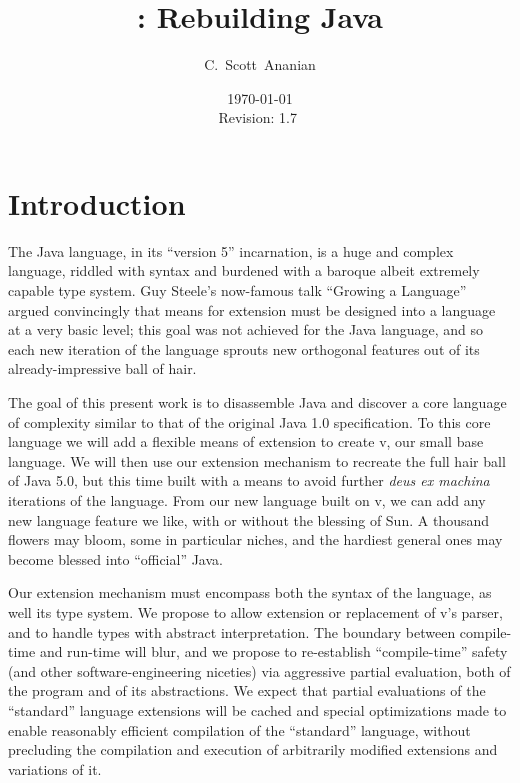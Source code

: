 \documentclass[11pt,notitlepage,twocolumn]{article}
\author{C.~Scott~Ananian}
\title{\vlang: Rebuilding Java}
\date{\today \\ $ $Revision: 1.7 $ $}
\newcommand{\vlang}{\textsf{v}\xspace}
\begin{document}

\maketitle

\section{Introduction}
The Java language, in its ``version 5'' incarnation, is a huge and
complex language, riddled with syntax and burdened with a baroque
albeit extremely capable type system.  Guy Steele's now-famous talk
``Growing a Language'' \cite{Steele99} argued convincingly that means
for extension must be designed into a language at a very basic level;
this goal was not achieved for the Java language, and so each new
iteration of the language sprouts new orthogonal features out of its
already-impressive ball of hair.

The goal of this present work is to disassemble Java and discover a
core language of complexity similar to that of the original Java
1.0 specification.  To this core language we will add a flexible means
of extension to create \vlang, our small base language.  We will then use
our extension mechanism to recreate the full hair ball of Java 5.0,
but this time built with a means to avoid further \emph{deus ex
  machina} iterations of the language.  From our new language built on
\vlang, we can add any new language feature we like, with or without the
blessing of Sun.  A thousand flowers may bloom, some in particular
niches, and the hardiest general ones may become blessed into
``official'' Java.

Our extension mechanism must encompass both the syntax of the
language, as well its type system.  We propose to allow extension or
replacement of \vlang's parser, and to handle types with abstract
interpretation.  The boundary between compile-time and run-time will
blur, and we propose to re-establish ``compile-time'' safety (and
other software-engineering niceties) via aggressive partial
evaluation, both of the program and of its abstractions.  We expect
that partial evaluations of the ``standard'' language extensions will
be cached and special optimizations made to enable reasonably
efficient compilation of the ``standard'' language, without precluding
the compilation and execution of arbitrarily modified extensions and
variations of it.
\end{document}
